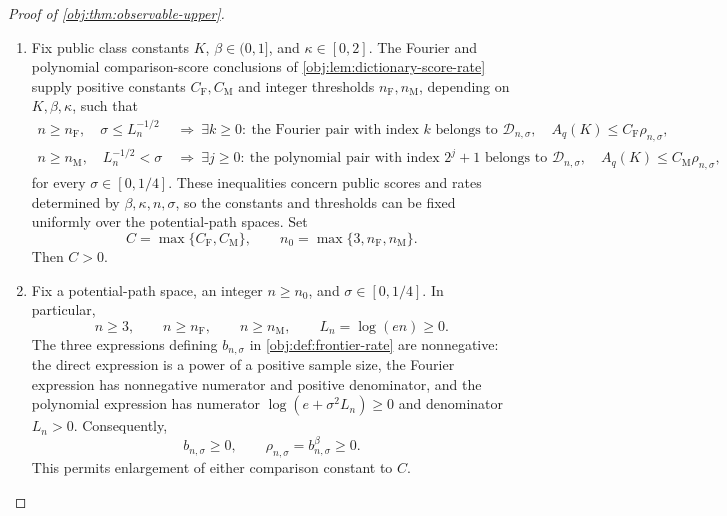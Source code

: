 \documentclass[11pt]{article}
\begin{document}
\begin{proof}[Proof of \cref{obj:thm:observable-upper}]
\begin{enumerate}
\item Fix public class constants \(K\), \(\beta\in(0,1]\), and \(\kappa\in[0,2]\). The Fourier and polynomial comparison-score conclusions of \cref{obj:lem:dictionary-score-rate} supply positive constants \(C_{\mathrm F},C_{\mathrm M}\) and integer thresholds \(n_{\mathrm F},n_{\mathrm M}\), depending on \(K,\beta,\kappa\), such that
\[
\begin{aligned}
n\ge n_{\mathrm F},\quad \sigma\le L_n^{-1/2}
&\ \Longrightarrow\
\exists k\ge0:\ 
\text{the Fourier pair with index }k\text{ belongs to }\mathcal D_{n,\sigma},
\quad A_q(K)\le C_{\mathrm F}\rho_{n,\sigma},\\
n\ge n_{\mathrm M},\quad L_n^{-1/2}<\sigma
&\ \Longrightarrow\
\exists j\ge0:\ 
\text{the polynomial pair with index }2^j+1\text{ belongs to }\mathcal D_{n,\sigma},
\quad A_q(K)\le C_{\mathrm M}\rho_{n,\sigma},
\end{aligned}
\]
for every \(\sigma\in[0,1/4]\). These inequalities concern public scores and rates determined by \(\beta,\kappa,n,\sigma\), so the constants and thresholds can be fixed uniformly over the potential-path spaces. Set
\[
C=\max\{C_{\mathrm F},C_{\mathrm M}\},
\qquad
n_0=\max\{3,n_{\mathrm F},n_{\mathrm M}\}.
\]
Then \(C>0\). %

\item Fix a potential-path space, an integer \(n\ge n_0\), and \(\sigma\in[0,1/4]\). In particular,
\[
n\ge3,\qquad n\ge n_{\mathrm F},\qquad n\ge n_{\mathrm M},
\qquad L_n=\log(en)\ge0.
\]
The three expressions defining \(b_{n,\sigma}\) in \cref{obj:def:frontier-rate} are nonnegative: the direct expression is a power of a positive sample size, the Fourier expression has nonnegative numerator and positive denominator, and the polynomial expression has numerator \(\log(e+\sigma^2L_n)\ge0\) and denominator \(L_n>0\). Consequently,
\[
b_{n,\sigma}\ge0,
\qquad
\rho_{n,\sigma}=b_{n,\sigma}^{\beta}\ge0.
\]
This permits enlargement of either comparison constant to \(C\). %


\end{enumerate}
\end{proof}
\end{document}
